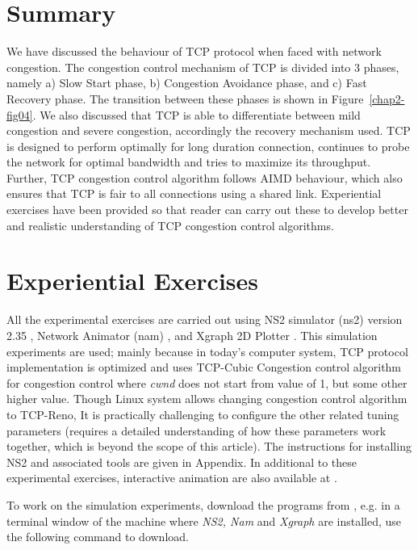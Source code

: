 \begin{multicols}{2}
\section*{Summary}

We have discussed the behaviour of TCP protocol when faced with network congestion. The congestion control mechanism of TCP is divided into 3 phases, namely a) Slow Start phase, b) Congestion Avoidance phase, and c) Fast Recovery phase. The transition between these phases is shown in Figure~\ref{chap2-fig04}. We also discussed that TCP is able to differentiate between mild congestion and severe congestion, accordingly  the recovery mechanism used. TCP is designed to perform optimally for long duration connection, continues to probe the network for optimal bandwidth and tries to maximize its throughput. Further, TCP congestion control algorithm follows AIMD behaviour, which also ensures that TCP is fair to all connections using a shared link. Experiential exercises have been provided so that reader can carry out these to develop better and realistic understanding of TCP congestion control algorithms.

\section*{Experiential Exercises}

All the experimental exercises are carried out using NS2 simulator (ns2) version 2.35 \cite{art2-key09}, Network Animator (nam) \cite{art2-key10}, and Xgraph 2D Plotter \cite{art2-key11}. This simulation experiments are used; mainly because in today’s computer system, TCP protocol implementation is optimized and uses TCP-Cubic Congestion control algorithm for congestion control where \textit{cwnd} does not start from value of 1, but some other higher value. Though Linux system allows changing congestion control algorithm to TCP-Reno, It is practically challenging to configure the other related tuning parameters (requires a detailed understanding of how these parameters work together, which is beyond the scope of this article). The instructions for installing NS2 and associated tools are given in Appendix. In additional to these experimental exercises, interactive animation are also available at \cite{art2-key14}.

To work on the simulation experiments, download the programs from \cite{art2-key12}, e.g. in a terminal window of the machine where \textit{NS2, Nam} and \textit{Xgraph} are installed, use the following command to download.
 

\end{multicols}
